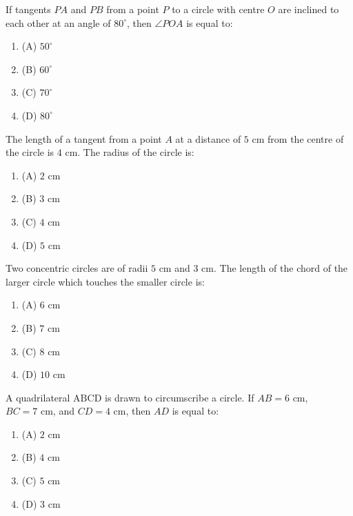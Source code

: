 \documentclass[12pt,a4paper]{exam}
\begin{document}
\begin{questions}
\question[1] If tangents $PA$ and $PB$ from a point $P$ to a circle with centre $O$ are inclined to each other at an angle of $80^\circ$, then $\angle POA$ is equal to:
\begin{enumerate}[label=(\Alph*)]
  \item (A) $50^\circ$
  \item (B) $60^\circ$
  \item (C) $70^\circ$
  \item (D) $80^\circ$
\end{enumerate}
\vspace{0.15cm}

\question[1] The length of a tangent from a point $A$ at a distance of $5 \text{ cm}$ from the centre of the circle is $4 \text{ cm}$. The radius of the circle is:
\begin{enumerate}[label=(\Alph*)]
  \item (A) $2 \text{ cm}$
  \item (B) $3 \text{ cm}$
  \item (C) $4 \text{ cm}$
  \item (D) $5 \text{ cm}$
\end{enumerate}
\vspace{0.15cm}

\question[1] Two concentric circles are of radii $5 \text{ cm}$ and $3 \text{ cm}$. The length of the chord of the larger circle which touches the smaller circle is:
\begin{enumerate}[label=(\Alph*)]
  \item (A) $6 \text{ cm}$
  \item (B) $7 \text{ cm}$
  \item (C) $8 \text{ cm}$
  \item (D) $10 \text{ cm}$
\end{enumerate}
\vspace{0.15cm}

\question[1] A quadrilateral $\text{ABCD}$ is drawn to circumscribe a circle. If $AB = 6 \text{ cm}$, $BC = 7 \text{ cm}$, and $CD = 4 \text{ cm}$, then $AD$ is equal to:
\begin{enumerate}[label=(\Alph*)]
  \item (A) $2 \text{ cm}$
  \item (B) $4 \text{ cm}$
  \item (C) $5 \text{ cm}$
  \item (D) $3 \text{ cm}$
\end{enumerate}
\vspace{0.15cm}


\end{questions}
\end{document}
